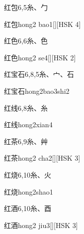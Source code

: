 \begin{entry}{红包}{6,5}{⽷、⼓}
  \begin{phonetics}{红包}{hong2 bao1}[][HSK 4]
  \end{phonetics}
\end{entry}

\begin{entry}{红色}{6,6}{⽷、⾊}
  \begin{phonetics}{红色}{hong2 se4}[][HSK 2]
  \end{phonetics}
\end{entry}

\begin{entry}{红宝石}{6,8,5}{⽷、⼧、⽯}
  \begin{phonetics}{红宝石}{hong2bao3shi2}
  \end{phonetics}
\end{entry}

\begin{entry}{红线}{6,8}{⽷、⽷}
  \begin{phonetics}{红线}{hong2xian4}
  \end{phonetics}
\end{entry}

\begin{entry}{红茶}{6,9}{⽷、⾋}
  \begin{phonetics}{红茶}{hong2 cha2}[][HSK 3]
  \end{phonetics}
\end{entry}

\begin{entry}{红烧}{6,10}{⽷、⽕}
  \begin{phonetics}{红烧}{hong2shao1}
  \end{phonetics}
\end{entry}

\begin{entry}{红酒}{6,10}{⽷、⾣}
  \begin{phonetics}{红酒}{hong2 jiu3}[][HSK 3]
  \end{phonetics}
\end{entry}

